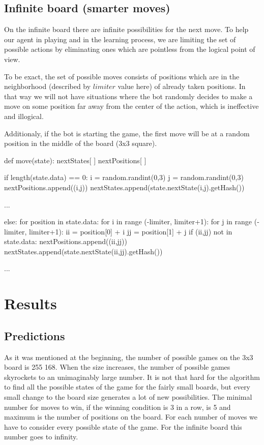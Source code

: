 \documentclass[a4paper,12pt]{book}
\begin{document}
	\section{Infinite board (smarter moves)}

On the infinite board there are infinite possibilities for the next move. To help our agent in playing and in the learning process, we are limiting the set of possible actions by eliminating ones which are pointless from the logical point of view. 

To be exact, the set of possible moves consists of positions which are in the neighborhood (described by $limiter$ value here) of already taken positions. In that way we will not have situations where the bot randomly decides to make a move on some position far away from the center of the action, which is ineffective and illogical. 

Additionaly, if the bot is starting the game, the first move will be at a random position in the middle of the board (3x3 square).

\begin{python}
def move(state):
  nextStates[ ]
  nextPositions[ ]

  if length(state.data) == 0:
    i = random.randint(0,3)
    j = random.randint(0,3)
    nextPositions.append((i,j))
    nextStates.append(state.nextState(i,j).getHash())

  ...
  
  else:
    for position in state.data:
      for i in range (-limiter, limiter+1):
        for j in range (-limiter, limiter+1):
          ii = position[0] + i
          jj = position[1] + j
          if (ii,jj) not in state.data:
             nextPositions.append((ii,jj))
             nextStates.append(state.nextState(ii,jj).getHash())
  
  ...
\end{python}

	\chapter{Results}

	\section{Predictions}

As it was mentioned at the beginning, the number of possible games on the 3x3 board is 255 168. When the size increases, the number of possible games skyrockets to an unimaginably large number. It is not that hard for the algorithm to find all the possible states of the game for the fairly small boards, but every small change to the board size generates a lot of new possibilities. The minimal number for moves to win, if the winning condition is 3 in a row, is 5 and maximum is the number of positions on the board. For each number of moves we have to consider every possible state of the game. For the infinite board this number goes to infinity.
\end{document}
